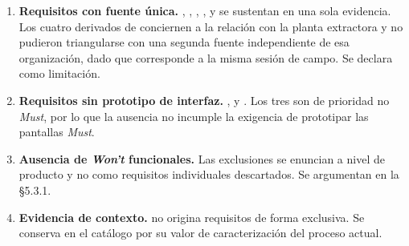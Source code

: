 \begin{enumerate}[nosep]
  \item \textbf{Requisitos con fuente única.} , , , ,
         y  se sustentan en una sola evidencia. Los cuatro derivados de
         conciernen a la relación con la planta extractora y no pudieron triangularse con
        una segunda fuente independiente de esa organización, dado que  corresponde a la
        misma sesión de campo. Se declara como limitación.
  \item \textbf{Requisitos sin prototipo de interfaz.} ,  y . Los tres
        son de prioridad no \emph{Must}, por lo que la ausencia no incumple la exigencia de
        prototipar las pantallas \emph{Must}.
  \item \textbf{Ausencia de \emph{Won't} funcionales.} Las exclusiones se enuncian a nivel de
        producto y no como requisitos individuales descartados. Se argumentan en la §5.3.1.
  \item \textbf{Evidencia de contexto.}  no origina requisitos de forma exclusiva. Se
        conserva en el catálogo por su valor de caracterización del proceso actual.
\end{enumerate}
